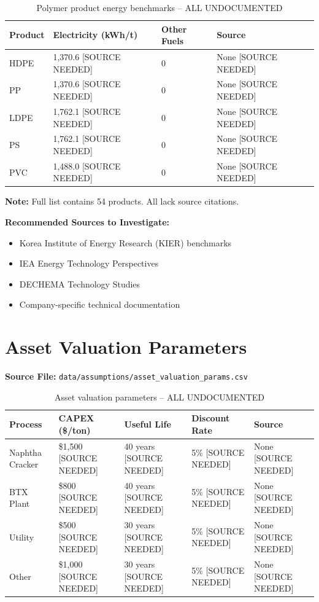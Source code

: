 \documentclass[12pt,a4paper]{article}
\newcommand{\nosource}[1]{\textcolor{sourcered}{#1 [SOURCE NEEDED]}}
\begin{document}
\begin{table}[H]
\centering
\begin{tabular}{llll}
\toprule
\textbf{Product} & \textbf{Electricity (kWh/t)} & \textbf{Other Fuels} & \textbf{Source} \\
\midrule
HDPE & \nosource{1,370.6} & 0 & \nosource{None} \\
PP & \nosource{1,370.6} & 0 & \nosource{None} \\
LDPE & \nosource{1,762.1} & 0 & \nosource{None} \\
PS & \nosource{1,762.1} & 0 & \nosource{None} \\
PVC & \nosource{1,488.0} & 0 & \nosource{None} \\
\bottomrule
\end{tabular}
\caption{Polymer product energy benchmarks -- \textcolor{sourcered}{ALL UNDOCUMENTED}}
\end{table}

\textbf{Note:} Full list contains 54 products. All lack source citations.

\textbf{Recommended Sources to Investigate:}
\begin{itemize}
    \item Korea Institute of Energy Research (KIER) benchmarks
    \item IEA Energy Technology Perspectives
    \item DECHEMA Technology Studies
    \item Company-specific technical documentation
\end{itemize}

\section{Asset Valuation Parameters}
\label{sec:asset_valuation}

\textbf{Source File:} \texttt{data/assumptions/asset\_valuation\_params.csv}

\begin{table}[H]
\centering
\begin{tabular}{lllll}
\toprule
\textbf{Process} & \textbf{CAPEX (\$/ton)} & \textbf{Useful Life} & \textbf{Discount Rate} & \textbf{Source} \\
\midrule
Naphtha Cracker & \nosource{\$1,500} & \nosource{40 years} & \nosource{5\%} & \nosource{None} \\
BTX Plant & \nosource{\$800} & \nosource{40 years} & \nosource{5\%} & \nosource{None} \\
Utility & \nosource{\$500} & \nosource{30 years} & \nosource{5\%} & \nosource{None} \\
Other & \nosource{\$1,000} & \nosource{30 years} & \nosource{5\%} & \nosource{None} \\
\bottomrule
\end{tabular}
\caption{Asset valuation parameters -- \textcolor{sourcered}{ALL UNDOCUMENTED}}
\end{table}
\end{document}
